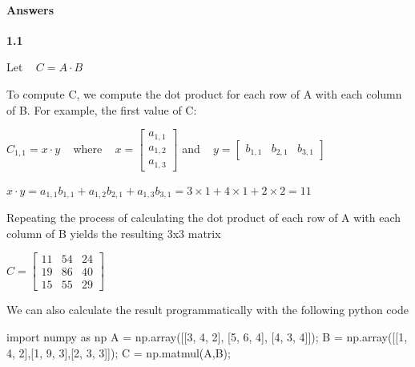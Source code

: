 \documentclass[11pt]{article}
\newenvironment{Shaded}{}{}
\newcommand{\DecValTok}[1]{\textcolor[rgb]{0.25,0.63,0.44}{{#1}}}
\newcommand{\NormalTok}[1]{{#1}}
\newcommand{\ImportTok}[1]{{#1}}
\newcommand{\OperatorTok}[1]{\textcolor[rgb]{0.40,0.40,0.40}{{#1}}}
\begin{document}
    \paragraph{Answers}\label{answers}

    \textbf{1.1}

    Let ~ \(C = A \cdot B\)

To compute C, we compute the dot product for each row of A with each
column of B. For example, the first value of C:

\(C_{1,1} = x \cdot y\) ~ where ~
\(x = \begin{bmatrix} a_{1,1} \\ a_{1,2} \\ a_{1,3} \end{bmatrix}\) and
~ \(y = \begin{bmatrix} b_{1,1} & b_{2,1} & b_{3,1}\end{bmatrix}\)

\(x \cdot y = a_{1,1}b_{1,1} + a_{1,2}b_{2,1} + a_{1,3}b_{3,1} = 3\times1 + 4\times1 + 2\times2 = 11\)

Repeating the process of calculating the dot product of each row of A
with each column of B yields the resulting 3x3 matrix

\(C = \begin{bmatrix} 11 & 54 & 24 \\ 19 & 86 & 40\\ 15 & 55 & 29 \end{bmatrix}\)

We can also calculate the result programmatically with the following
python code

\begin{Shaded}
\begin{Highlighting}[]
\ImportTok{import}\NormalTok{ numpy }\ImportTok{as}\NormalTok{ np}
\NormalTok{A }\OperatorTok{=}\NormalTok{ np.array([[}\DecValTok{3}\NormalTok{, }\DecValTok{4}\NormalTok{, }\DecValTok{2}\NormalTok{], [}\DecValTok{5}\NormalTok{, }\DecValTok{6}\NormalTok{, }\DecValTok{4}\NormalTok{], [}\DecValTok{4}\NormalTok{, }\DecValTok{3}\NormalTok{, }\DecValTok{4}\NormalTok{]])}\OperatorTok{;}
\NormalTok{B }\OperatorTok{=}\NormalTok{ np.array([[}\DecValTok{1}\NormalTok{, }\DecValTok{4}\NormalTok{,  }\DecValTok{2}\NormalTok{],[}\DecValTok{1}\NormalTok{, }\DecValTok{9}\NormalTok{, }\DecValTok{3}\NormalTok{],[}\DecValTok{2}\NormalTok{, }\DecValTok{3}\NormalTok{, }\DecValTok{3}\NormalTok{]])}\OperatorTok{;}
\NormalTok{C }\OperatorTok{=}\NormalTok{ np.matmul(A,B)}\OperatorTok{;}
\end{Highlighting}
\end{Shaded}
\end{document}

